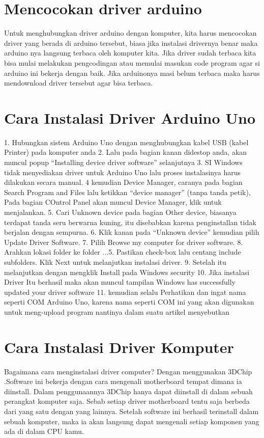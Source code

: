 \section{Mencocokan driver arduino}
Untuk menghubungkan driver arduino dengan komputer, kita harus mencocokan driver yang berada di arduino tersebut, biasa jika instalasi drivernya benar maka arduino nya langsung terbaca oleh komputer kita. Jika driver sudah terbaca kita bisa mulai melakukan pengcodingan atau memulai masukan code program agar si arduino ini bekerja dengan baik. Jika arduinonya masi belum terbaca maka harus mendownload driver tersebut agar bisa terbaca.

\section{Cara Instalasi Driver Arduino Uno}
1. Hubungkan sistem  Arduino Uno dengan menghubungkan kabel USB (kabel Printer) pada komputer anda
2. Lalu pada bagian kanan didestop anda, akan muncul popup “Installing device driver software” selanjutnya
3. SI Windows tidak menyediakan driver untuk Arduino Uno lalu proses instalasinya harus dilakukan secara manual.
4 kemudian Device Manager, caranya pada bagian Search Program and Files lalu ketikkan “device manager” (tanpa tanda petik), Pada bagian COntrol Panel akan muncul Device Manager, klik untuk menjalankan.
5. Cari Unknown device pada bagian Other device, biasanya terdapat tanda seru berwarna kuning, itu disebabkan karena penginstallan tidak berjalan dengan sempurna.
6. Klik kanan pada “Unknown device” kemudian pilih Update Driver Software.
7. Pilih Browse my computer for driver software.
8. Arahkan lokasi folder ke folder ...5\drivers. Pastikan check-box lalu centang include subfolders. Klik Next untuk melanjutkan instalasi driver.
9. Setelah itu melanjutkan dengan mengklik Install pada Windows security
10. Jika instalasi Driver Itu berhasil maka akan muncul tampilan Windows has successfully updated your driver software
11. kemudian selalu Perhatikan dan ingat nama seperti COM Arduino Uno, karena nama  seperti COM ini yang akan  digunakan untuk meng-upload program nantinya
dalam suatu artikel menyebutkan \cite{teikari2012inexpensive}

\section{Cara Instalasi Driver Komputer}
Bagaimana cara menginstalasi driver computer? 
Dengan menggunakan 3DChip .Software ini bekerja dengan cara mengenali motherboard tempat dimana ia diinstall. Dalam penggunaannya 3DChip hanya dapat diinstall di dalam sebuah perangkat komputer saja. Sebab setiap driver motherboard tentu saja berbeda dari  yang satu dengan yang lainnya. Setelah software ini berhasil terinstall dalam sebuah komputer, maka ia akan langsung dapat mengenali setiap komponen yang ada di dalam CPU kamu. 

